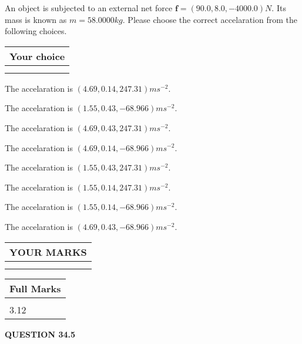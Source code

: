 \documentclass[12pt]{article}
\begin{document}
  
 
 
An object is subjected to an external net force $\mathbf{f}=
(90.0 , 8.0 , -4000.0) N$.
Its mass is known as $m= %
58.0000 kg$. Please choose the
correct accelaration from the following choices.
 
  
  
\noindent\hspace{3.0in} \begin{tabular}{|l|}
\hline
Your choice \\
\hline
 \\ 
 \\ 
\hline
\end{tabular}
  
  
 
 
The accelaration is $  %
(
4.69,
0.14,
247.31)
ms^{-2} $.
 
 
The accelaration is $  %
(
1.55,
0.43,
-68.966)
ms^{-2} $.
 
 
The accelaration is $  %
(
4.69,
0.43,
247.31)
ms^{-2} $.
 
 
The accelaration is $  %
(
4.69,
0.14,
-68.966)
ms^{-2} $.
 
 
The accelaration is $  %
(
1.55,
0.43,
247.31)
ms^{-2} $.
 
 
The accelaration is $  %
(
1.55,
0.14,
247.31)
ms^{-2} $.
 
 
The accelaration is $  %
(
1.55,
0.14,
-68.966)
ms^{-2} $.
 
 
The accelaration is $  %
(
4.69,
0.43,
-68.966)
ms^{-2} $.
 
 
 

 

 
\vspace{0.3in}
  
\vspace{0.2in}
  
\noindent\begin{tabular}{|l|}
\hline
 YOUR MARKS  \\
\hline
 \\ 
 \\ 
\hline
\end{tabular}
\hspace{0.05in} \begin{tabular}{|l|}
\hline
 Full Marks  \\
\hline
 \\ 
3.12 \\
\hline
\end{tabular}
{\textbf{\Large{QUESTION
34.5 
}}}
  
\end{document}
